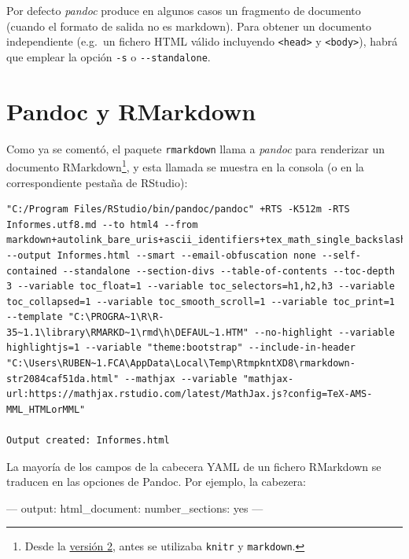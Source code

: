 \documentclass[]{book}
\newenvironment{Shaded}{\begin{snugshade}}{\end{snugshade}}
\newcommand{\OtherTok}[1]{\textcolor[rgb]{0.56,0.35,0.01}{#1}}
\newcommand{\FunctionTok}[1]{\textcolor[rgb]{0.00,0.00,0.00}{#1}}
\newcommand{\AttributeTok}[1]{\textcolor[rgb]{0.77,0.63,0.00}{#1}}
\let\rmarkdownfootnote\footnote%
\def\footnote{\protect\rmarkdownfootnote}
\theoremstyle{definition}
\theoremstyle{definition}
\theoremstyle{definition}
\theoremstyle{remark}
\begin{document}
Por defecto \emph{pandoc} produce en algunos casos un fragmento de
documento (cuando el formato de salida no es markdown). Para obtener un
documento independiente (e.g.~un fichero HTML válido incluyendo
\texttt{\textless{}head\textgreater{}} y
\texttt{\textless{}body\textgreater{}}), habrá que emplear la opción
\texttt{-s} o \texttt{-\/-standalone}.

\section{Pandoc y RMarkdown}\label{pandoc-y-rmarkdown}

Como ya se comentó, el paquete \texttt{rmarkdown} llama a \emph{pandoc}
para renderizar un documento RMarkdown\footnote{Desde la
  \href{https://blog.rstudio.org/2014/06/18/r-markdown-v2/}{versión 2},
  antes se utilizaba \texttt{knitr} y \texttt{markdown}.}, y esta
llamada se muestra en la consola (o en la correspondiente pestaña de
RStudio):

\begin{verbatim}
"C:/Program Files/RStudio/bin/pandoc/pandoc" +RTS -K512m -RTS Informes.utf8.md --to html4 --from markdown+autolink_bare_uris+ascii_identifiers+tex_math_single_backslash --output Informes.html --smart --email-obfuscation none --self-contained --standalone --section-divs --table-of-contents --toc-depth 3 --variable toc_float=1 --variable toc_selectors=h1,h2,h3 --variable toc_collapsed=1 --variable toc_smooth_scroll=1 --variable toc_print=1 --template "C:\PROGRA~1\R\R-35~1.1\library\RMARKD~1\rmd\h\DEFAUL~1.HTM" --no-highlight --variable highlightjs=1 --variable "theme:bootstrap" --include-in-header "C:\Users\RUBEN~1.FCA\AppData\Local\Temp\RtmpkntXD8\rmarkdown-str2084caf51da.html" --mathjax --variable "mathjax-url:https://mathjax.rstudio.com/latest/MathJax.js?config=TeX-AMS-MML_HTMLorMML"

Output created: Informes.html
\end{verbatim}

La mayoría de los campos de la cabecera YAML de un fichero RMarkdown se
traducen en las opciones de Pandoc. Por ejemplo, la cabezera:

\begin{Shaded}
\begin{Highlighting}[]
\OtherTok{---}
\FunctionTok{output:}
  \FunctionTok{html_document:}
    \FunctionTok{number_sections:}\AttributeTok{ yes      }
\OtherTok{---}
\end{Highlighting}
\end{Shaded}
\end{document}
